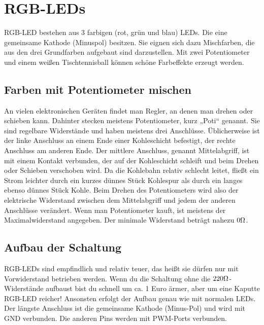 \section{RGB-LEDs}
RGB-LED bestehen aus 3 farbigen (rot, grün und blau) LEDs. Die eine gemeinsame Kathode (Minuspol) besitzen. Sie eignen sich dazu Mischfarben, die aus den drei Grundfarben aufgebaut sind darzustellen. Mit zwei Potentiometer und einem weißen Tischtennisball können schöne Farbeffekte erzeugt werden.      


\subsection{Farben mit Potentiometer mischen}

An vielen elektronischen Geräten findet man Regler, an denen man drehen oder schieben kann. Dahinter stecken meistens Potentiometer, kurz „Poti“ genannt. Sie sind regelbare Widerstände und haben meistens drei Anschlüsse. Üblicherweise ist der linke Anschluss an einem Ende einer Kohleschicht befestigt, der rechte Anschluss am anderen Ende. Der mittlere Anschluss, genannt Mittelabgriff, ist mit einem Kontakt verbunden, der auf der Kohleschicht schleift und beim Drehen oder Schieben verschoben wird. Da die Kohlebahn relativ schlecht leitet, fließt ein Strom leichter durch ein kurzes dünnes Stück Kohlespur als durch ein langes ebenso dünnes Stück Kohle. Beim Drehen des Potentiometers wird also der elektrische Widerstand zwischen dem Mittelabgriff und jedem der anderen Anschlüsse verändert. Wenn man Potentiometer kauft, ist meistens der Maximalwiderstand angegeben. Der minimale Widerstand beträgt nahezu $0\Omega$.

\subsection{Aufbau der Schaltung}
RGB-LEDs sind empfindlich und relativ teuer, das heißt sie dürfen nur mit Vorwiderstand betrieben werden. Wenn du die Schaltung ohne die $220\Omega$-Widerstände aufbaust bist du schnell um ca. 1 Euro ärmer, aber um eine Kaputte RGB-LED reicher! Ansonsten erfolgt der Aufbau genau wie mit normalen LEDs. Der längste Anschluss ist die gemeinsame Kathode (Minus-Pol) und wird mit GND verbunden. Die anderen Pins werden mit PWM-Ports verbunden.   

